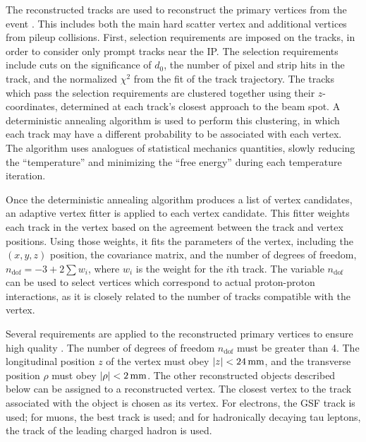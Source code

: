 The reconstructed tracks are used to reconstruct the primary vertices from the event \cite{TrackingJINST}. This includes both the main hard scatter vertex and additional vertices from pileup collisions. First, selection requirements are imposed on the tracks, in order to consider only prompt tracks near the IP. The selection requirements include cuts on the significance of $d_0$, the number of pixel and strip hits in the track, and the normalized $\chi^2$ from the fit of the track trajectory. The tracks which pass the selection requirements are clustered together using their $z$-coordinates, determined at each track's closest approach to the beam spot. A deterministic annealing algorithm is used to perform this clustering, in which each track may have a different probability to be associated with each vertex. The algorithm uses analogues of statistical mechanics quantities, slowly reducing the ``temperature'' and minimizing the ``free energy'' during each temperature iteration.

Once the deterministic annealing algorithm produces a list of vertex candidates, an adaptive vertex fitter is applied to each vertex candidate. This fitter weights each track in the vertex based on the agreement between the track and vertex positions. Using those weights, it fits the parameters of the vertex, including the $(x,y,z)$ position, the covariance matrix, and the number of degrees of freedom, $n_{\text{dof}} = -3 + 2 \sum{w_i}$, where $w_i$ is the weight for the $i$th track. The variable $n_{\text{dof}}$ can be used to select vertices which correspond to actual proton-proton interactions, as it is closely related to the number of tracks compatible with the vertex.

Several requirements are applied to the reconstructed primary vertices to ensure high quality \cite{CMS-PAS-TRK-10-005}. The number of degrees of freedom $n_{\text{dof}}$ must be greater than 4. The longitudinal position $z$ of the vertex must obey $|z|<24\,\text{mm}$, and the transverse position $\rho$ must obey $|\rho|<2\,\text{mm}$. The other reconstructed objects described below can be assigned to a reconstructed vertex. The closest vertex to the track associated with the object is chosen as its vertex. For electrons, the GSF track is used; for muons, the best track is used; and for hadronically decaying tau leptons, the track of the leading charged hadron is used.


